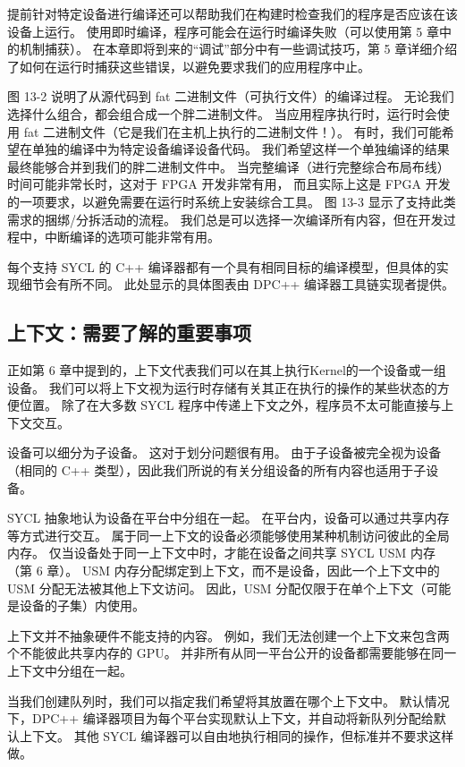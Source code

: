 提前针对特定设备进行编译还可以帮助我们在构建时检查我们的程序是否应该在该设备上运行。 
使用即时编译，程序可能会在运行时编译失败（可以使用第 5 章中的机制捕获）。 
在本章即将到来的“调试”部分中有一些调试技巧，第 5 章详细介绍了如何在运行时捕获这些错误，以避免要求我们的应用程序中止。

图 13-2 说明了从源代码到 fat 二进制文件（可执行文件）的编译过程。 
无论我们选择什么组合，都会组合成一个胖二进制文件。 
当应用程序执行时，运行时会使用 fat 二进制文件（它是我们在主机上执行的二进制文件！）。 
有时，我们可能希望在单独的编译中为特定设备编译设备代码。 
我们希望这样一个单独编译的结果最终能够合并到我们的胖二进制文件中。 
当完整编译（进行完整综合布局布线）时间可能非常长时，这对于 FPGA 开发非常有用，
而且实际上这是 FPGA 开发的一项要求，以避免需要在运行时系统上安装综合工具。 
图 13-3 显示了支持此类需求的捆绑/分拆活动的流程。 
我们总是可以选择一次编译所有内容，但在开发过程中，中断编译的选项可能非常有用。

每个支持 SYCL 的 C++ 编译器都有一个具有相同目标的编译模型，但具体的实现细节会有所不同。 
此处显示的具体图表由 DPC++ 编译器工具链实现者提供。

\subsection{上下文：需要了解的重要事项}
正如第 6 章中提到的，上下文代表我们可以在其上执行Kernel的一个设备或一组设备。 
我们可以将上下文视为运行时存储有关其正在执行的操作的某些状态的方便位置。 
除了在大多数 SYCL 程序中传递上下文之外，程序员不太可能直接与上下文交互。

设备可以细分为子设备。 这对于划分问题很有用。 
由于子设备被完全视为设备（相同的 C++ 类型），因此我们所说的有关分组设备的所有内容也适用于子设备。

SYCL 抽象地认为设备在平台中分组在一起。 在平台内，设备可以通过共享内存等方式进行交互。 
属于同一上下文的设备必须能够使用某种机制访问彼此的全局内存。 
仅当设备处于同一上下文中时，才能在设备之间共享 SYCL USM 内存（第 6 章）。 
USM 内存分配绑定到上下文，而不是设备，因此一个上下文中的 USM 分配无法被其他上下文访问。 
因此，USM 分配仅限于在单个上下文（可能是设备的子集）内使用。

上下文并不抽象硬件不能支持的内容。 
例如，我们无法创建一个上下文来包含两个不能彼此共享内存的 GPU。 
并非所有从同一平台公开的设备都需要能够在同一上下文中分组在一起。

当我们创建队列时，我们可以指定我们希望将其放置在哪个上下文中。 
默认情况下，DPC++ 编译器项目为每个平台实现默认上下文，并自动将新队列分配给默认上下文。 
其他 SYCL 编译器可以自由地执行相同的操作，但标准并不要求这样做。

